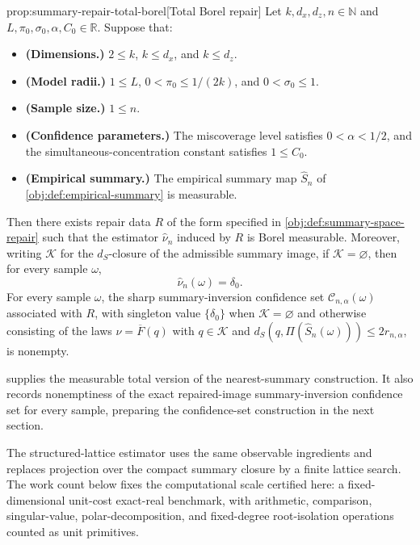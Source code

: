 \begin{propositionv}{prop:summary-repair-total-borel}[Total Borel repair]
Let \(k,d_x,d_z,n\in\mathbb N\) and \(L,\pi_0,\sigma_0,\alpha,C_0\in\mathbb R\).  Suppose that:
\begin{itemize}
\item \textbf{(Dimensions.)} \(2\le k\), \(k\le d_x\), and \(k\le d_z\).
\item \textbf{(Model radii.)} \(1\le L\), \(0<\pi_0\le 1/(2k)\), and \(0<\sigma_0\le 1\).
\item \textbf{(Sample size.)} \(1\le n\).
\item \textbf{(Confidence parameters.)} The miscoverage level satisfies \(0<\alpha<1/2\), and the simultaneous-concentration constant satisfies \(1\le C_0\).
\item \textbf{(Empirical summary.)} The empirical summary map \(\widehat S_n\) of \cref{obj:def:empirical-summary} is measurable.
\end{itemize}
Then there exists repair data \(R\) of the form specified in \cref{obj:def:summary-space-repair} such that the estimator \(\widehat\nu_n\) induced by \(R\) is Borel measurable.  Moreover, writing \(\mathcal K\) for the \(d_S\)-closure of the admissible summary image, if \(\mathcal K=\varnothing\), then for every sample \(\omega\),
\[
\widehat\nu_n(\omega)=\delta_0.
\]
For every sample \(\omega\), the sharp summary-inversion confidence set \(\mathcal C_{n,\alpha}(\omega)\) associated with \(R\), with singleton value \(\{\delta_0\}\) when \(\mathcal K=\varnothing\) and otherwise consisting of the laws \(\nu=\overline F(q)\) with \(q\in\mathcal K\) and \(d_S(q,\Pi(\widehat S_n(\omega)))\le 2r_{n,\alpha}\), is nonempty.
\end{propositionv}

 supplies the measurable total version of the nearest-summary construction. It also records nonemptiness of the exact repaired-image summary-inversion confidence set for every sample, preparing the confidence-set construction in the next section.

The structured-lattice estimator uses the same observable ingredients and replaces projection over the compact summary closure by a finite lattice search. The work count below fixes the computational scale certified here: a fixed-dimensional unit-cost exact-real benchmark, with arithmetic, comparison, singular-value, polar-decomposition, and fixed-degree root-isolation operations counted as unit primitives.

